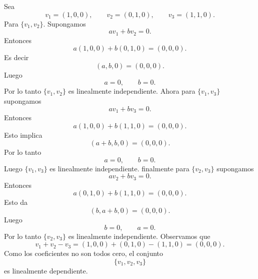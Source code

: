 \documentclass[12pt,a4paper]{article}
\begin{document}
    \begin{solucion}
        Sea
        \begin{equation*}
            v_{1}=(1,0,0),\qquad v_{2}=(0,1,0),\qquad v_{3}=(1,1,0).
        \end{equation*}
        Para $\{v_{1},v_{2}\}$. Supongamos
        \begin{equation*}
            av_{1}+bv_{2}=0.
        \end{equation*}
        Entonces
        \begin{equation*}
            a(1,0,0)+b(0,1,0)=(0,0,0).
        \end{equation*}
        Es decir
        \begin{equation*}
            (a,b,0)=(0,0,0).
        \end{equation*}
        Luego
        \begin{equation*}
            a=0,\qquad b=0.
        \end{equation*}
        Por lo tanto $\{v_{1},v_{2}\}$ es linealmente independiente. Ahora para
        $\{v_{1},v_{3}\}$ supongamos
        \begin{equation*}
            av_{1}+bv_{3}=0.
        \end{equation*}
        Entonces
        \begin{equation*}
            a(1,0,0)+b(1,1,0)=(0,0,0).
        \end{equation*}
        Esto implica
        \begin{equation*}
            (a+b,b,0)=(0,0,0).
        \end{equation*}
        Por lo tanto
        \begin{equation*}
            a=0,\qquad b=0.
        \end{equation*}
        Luego $\{v_{1},v_{3}\}$ es linealmente independiente. finalmente para $\{v_{2},v_{3}\}$
        supongamos
        \begin{equation*}
            av_{2}+bv_{3}=0.
        \end{equation*}
        Entonces
        \begin{equation*}
            a(0,1,0)+b(1,1,0)=(0,0,0).
        \end{equation*}
        Esto da
        \begin{equation*}
            (b,a+b,0)=(0,0,0).
        \end{equation*}
        Luego
        \begin{equation*}
            b=0,\qquad a=0.
        \end{equation*}
        Por lo tanto $\{v_{2},v_{3}\}$ es linealmente independiente. Observamos que
        \begin{equation*}
            v_{1}+v_{2}-v_{3}=(1,0,0)+(0,1,0)-(1,1,0)=(0,0,0).
        \end{equation*}
        Como los coeficientes no son todos cero, el conjunto
        \begin{equation*}
            \{v_{1},v_{2},v_{3}\}
        \end{equation*}
        es linealmente dependiente.
    \end{solucion}
\end{document}
